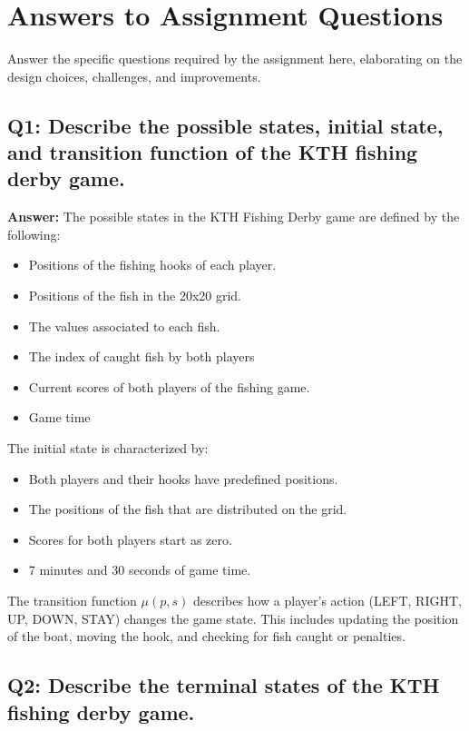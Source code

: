 \documentclass[12pt]{article}
\begin{document}
\section{Answers to Assignment Questions}
Answer the specific questions required by the assignment here, elaborating on the design choices, challenges, and improvements.

\subsection*{Q1: Describe the possible states, initial state, and transition function of the KTH fishing derby game.}

\textbf{Answer:}  
The possible states in the KTH Fishing Derby game are defined by the following:
\begin{itemize}
    \item Positions of the fishing hooks of each player.
    \item Positions of the fish in the 20x20 grid.
    \item The values associated to each fish.
    \item The index of caught fish by both players
    \item Current scores of both players of the fishing game.
    \item Game time
\end{itemize}

The initial state is characterized by:
\begin{itemize}
    \item Both players and their hooks have predefined positions.
    \item The positions of the fish that are distributed on the grid.
    \item Scores for both players start as zero.
    \item 7 minutes and 30 seconds of game time.
\end{itemize}

The transition function \( \mu(p, s) \) describes how a player’s action (LEFT, RIGHT, UP, DOWN, STAY) changes the game state. This includes updating the position of the boat, moving the hook, and checking for fish caught or penalties.

\subsection*{Q2: Describe the terminal states of the KTH fishing derby game.}
\end{document}
